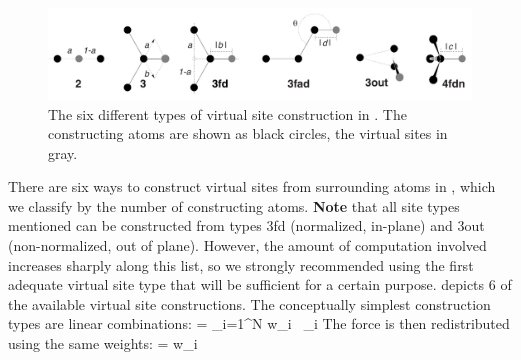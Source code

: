 \begin{figure}
\centerline{\includegraphics[width=15cm]{plots/dummies}}
\caption[Virtual site construction.]{The six different types of virtual
site construction in \protect{\gromacs}. The constructing atoms are
shown as black circles, the virtual sites in gray.}
\label{fig:vsites}
\end{figure}

There are six ways to construct virtual sites from surrounding atoms in
{\gromacs}, which we classify by the number of constructing
atoms. {\bf Note} that all site types mentioned can be constructed from
types 3fd (normalized, in-plane) and 3out (non-normalized, out of
plane). However, the amount of computation involved increases sharply
along this list, so we strongly recommended using the first adequate
virtual site type that will be sufficient for a certain purpose.
 depicts 6 of the available virtual site constructions.
The conceptually simplest construction types are linear combinations:
\beq
\vvis = \sum_{i=1}^N w_i \, _i
\eeq
The force is then redistributed using the same weights:
\beq
\Fi = w_i \, \Fvis
\eeq

